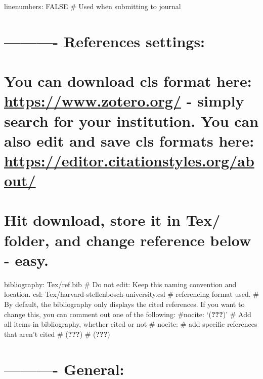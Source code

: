 \documentclass[preprint, authoryear]{article}
\numberwithin{equation}{section}
\numberwithin{figure}{section}
\numberwithin{table}{section}
\begin{document}
linenumbers: FALSE \# Used when submitting to journal

\hypertarget{references-settings}{%
\section{---------- References settings:}\label{references-settings}}

\hypertarget{you-can-download-cls-format-here-httpswww.zotero.org---simply-search-for-your-institution.-you-can-also-edit-and-save-cls-formats-here-httpseditor.citationstyles.orgabout}{%
\section{\texorpdfstring{You can download cls format here:
\url{https://www.zotero.org/} - simply search for your institution. You
can also edit and save cls formats here:
\url{https://editor.citationstyles.org/about/}}{You can download cls format here: https://www.zotero.org/ - simply search for your institution. You can also edit and save cls formats here: https://editor.citationstyles.org/about/}}\label{you-can-download-cls-format-here-httpswww.zotero.org---simply-search-for-your-institution.-you-can-also-edit-and-save-cls-formats-here-httpseditor.citationstyles.orgabout}}

\hypertarget{hit-download-store-it-in-tex-folder-and-change-reference-below---easy.}{%
\section{Hit download, store it in Tex/ folder, and change reference
below -
easy.}\label{hit-download-store-it-in-tex-folder-and-change-reference-below---easy.}}

bibliography: Tex/ref.bib \# Do not edit: Keep this naming convention
and location. csl: Tex/harvard-stellenbosch-university.csl \#
referencing format used. \# By default, the bibliography only displays
the cited references. If you want to change this, you can comment out
one of the following: \#nocite: `({\textbf{???}})' \# Add all items in
bibliography, whether cited or not \# nocite: \textbar{} \# add specific
references that aren't cited \# ({\textbf{???}}) \# ({\textbf{???}})

\hypertarget{general}{%
\section{---------- General:}\label{general}}
\end{document}
